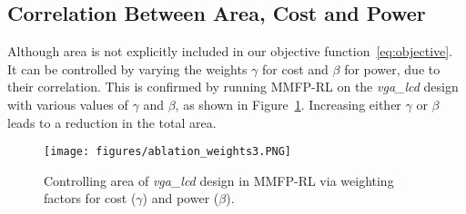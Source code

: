 \subsection{Correlation Between Area, Cost and Power}

Although area is not explicitly included in our objective
function~\eqref{eq:objective}. It can be controlled by varying the weights $\gamma$ for cost
and $\beta$ for power, due to their correlation.  
This is confirmed by running MMFP-RL on the \emph{vga\_lcd} design with various values of $\gamma$
and $\beta$, as shown in Figure~\ref{fig:ablation_weights}. Increasing either $\gamma$ or $\beta$ leads to a reduction in the total area.

\begin{figure}[ht]
\centering
\vspace{-2mm}
\texttt{[image: figures/ablation\_weights3.PNG]}
\vspace{-2mm}
\caption{Controlling area of \emph{vga\_lcd} design in MMFP-RL via weighting factors for cost ($\gamma$) and power ($\beta$).}
\label{fig:ablation_weights}
\vspace{-2mm}
\end{figure}